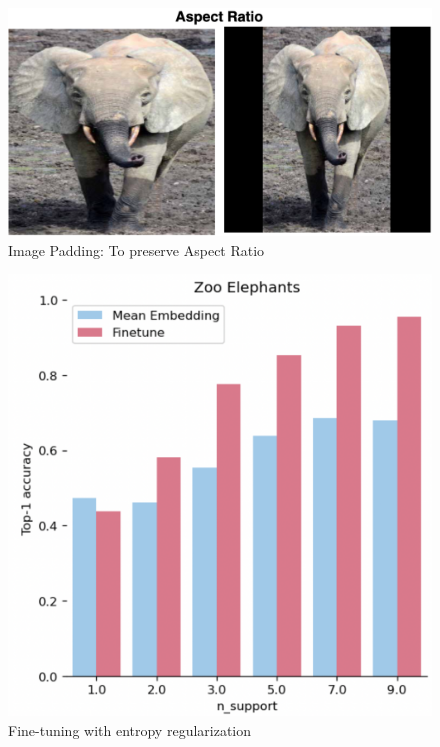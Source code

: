 \documentclass[10pt,twocolumn,letterpaper]{article}
\begin{document}
\begin{figure}[t]
  \centering
  \includegraphics[scale=0.23]{image_padding}
   \caption{Image Padding: To preserve Aspect Ratio}
   \label{fig:image_padding}
\end{figure}

\begin{figure}[t]
  \centering
  \includegraphics[scale=0.35]{finetune_graph}
   \caption{Fine-tuning with entropy regularization}
   \label{fig:finetune_graph}
\end{figure}
\end{document}

